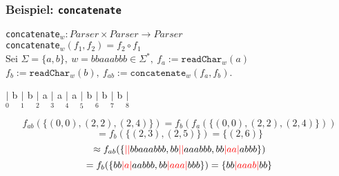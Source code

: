 \documentclass{beamer}
\newcommand{\red}[1]{\textcolor{red}{#1}}
\begin{document}
    \begin{frame}[t]
        \frametitle{\textbf{Beispiel:} \texttt{concatenate}}
        \texttt{concatenate}$_w : Parser \times Parser \to Parser$\\
        \texttt{concatenate}$_w(f_1,f_2) = f_2 \circ f_1$\\[10pt]
        Sei $\Sigma = \{a,b\},\ w = bbaaabbb \in \Sigma^*,\ f_a := \texttt{readChar}_w(a)$\\
        $f_b := \texttt{readChar}_w(b),\ f_{ab} := \texttt{concatenate}_w(f_a,f_b)$.\\
        \begin{center}
            $\underset{0}{|}$
                {\Large b}
            $\underset{1}{|}$
                {\Large b}
            $\underset{2}{|}$
                {\Large a}
            $\underset{3}{|}$
                {\Large a}
            $\underset{4}{|}$
                {\Large a}
            $\underset{5}{|}$
                {\Large b}
            $\underset{6}{|}$
                {\Large b}
            $\underset{7}{|}$
                {\Large b}
            $\underset{8}{|}$\\[30pt]
        \end{center}
        \pause
        $$
            f_{ab}(\{(0,0), (2,2), (2,4)\})
            = f_b(f_a(\{(0,0), (2,2), (2,4)\}))
        $$$$
            = f_b(\{(2,3), (2,5)\})
            = \{(2,6)\}
        $$
        \pause
        $$
            \approx f_{ab}(\{\red{||}bbaaabbb, bb\red{||}aaabbb, bb\red{|aa|}abbb\})
        $$$$
            = f_b(\{bb\red{|a|}aabbb, bb\red{|aaa|}bbb\})
            = \{bb\red{|aaab|}bb\}
        $$
    \end{frame}


\end{document}

